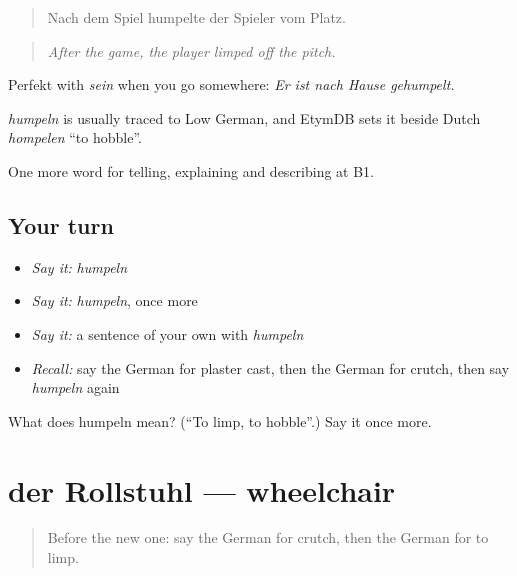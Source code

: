\begin{quote}
Nach dem Spiel humpelte der Spieler vom Platz.
\end{quote}

\begin{quote}
\emph{After the game, the player limped off the pitch.}
\end{quote}

Perfekt with \emph{sein} when you go somewhere: \emph{Er ist nach Hause gehumpelt.}

\begin{cousinweb}
\emph{humpeln} is usually traced to Low German, and EtymDB sets it beside Dutch \emph{hompelen} \textquotedblleft{}to hobble\textquotedblright{}.
\end{cousinweb}

\begin{grammarlens}[title={What you've built}]
One more word for telling, explaining and describing at B1.
\end{grammarlens}

\subsection*{Your turn}
\begin{itemize}
\raggedright
  \item \emph{Say it:} \emph{humpeln}
  \item \emph{Say it:} \emph{humpeln}, once more
  \item \emph{Say it:} a sentence of your own with \emph{humpeln}
  \item \emph{Recall:} say the German for plaster cast, then the German for crutch, then say \emph{humpeln} again
\end{itemize}

\begin{tcolorbox}[breakable,colback=teal!4,colframe=teal!35!black,title={Before you move on}]
What does humpeln mean? (\textquotedblleft{}To limp, to hobble\textquotedblright{}.) Say it once more.
\end{tcolorbox}
\section[der Rollstuhl]{der Rollstuhl — wheelchair}

\label{lesson:GE-C483-rollstuhl}



\begin{quote}
Before the new one: say the German for crutch, then the German for to limp.
\end{quote}

